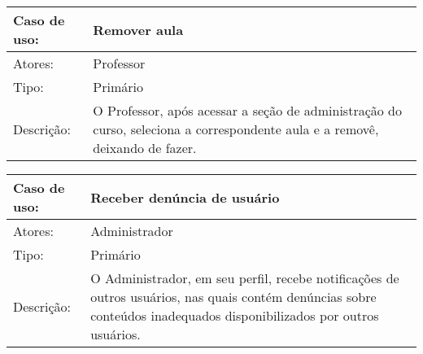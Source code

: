 \documentclass[12pt,a4paper,onecolumn,titlepage]{article}
\begin{document}
\begin{table}[h!]
\begin{center}
\begin{tabular}{p{2.5cm} p{9.5cm}}
Caso de uso: & \textbf{Remover aula} \\ \hline
Atores: & Professor \\ \hline
Tipo: & Primário \\ \hline
Descrição: & O Professor, após acessar a seção de administração do curso, seleciona a correspondente aula e a removê, deixando de fazer.

\end{tabular}
\end{center}
\end{table}

\begin{table}[h!]
\begin{center}
\begin{tabular}{p{2.5cm} p{9.5cm}}
Caso de uso: & \textbf{Receber denúncia de usuário} \\ \hline
Atores: & Administrador \\ \hline
Tipo: & Primário \\ \hline
Descrição: & O Administrador, em seu perfil, recebe notificações de outros usuários, nas quais contém denúncias sobre conteúdos inadequados disponibilizados por outros usuários.

\end{tabular}
\end{center}
\end{table}
\end{document}
